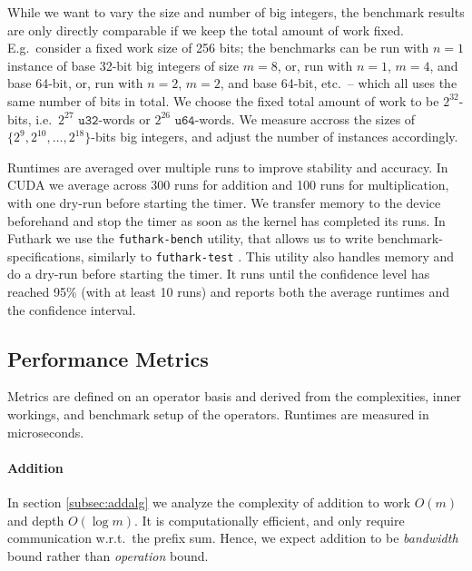 While we want to vary the size and number of big integers, the benchmark results
are only directly comparable if we keep the total amount of work fixed. E.g.\
consider a fixed work size of 256 bits; the benchmarks can be run with $n=1$
instance of base 32-bit big integers of size $m=8$, or, run with $n=1$, $m=4$,
and base 64-bit, or, run with $n=2$, $m=2$, and base 64-bit, etc.\ -- which all
uses the same number of bits in total. We choose the fixed total amount of work
to be $2^{32}$-bits, i.e.\ $2^{27}$ $\mathtt{u32}$-words or $2^{26}$
$\mathtt{u64}$-words. We measure accross the sizes of
$\{2^9,2^{10},\ldots,2^{18}\}$-bits big integers, and adjust the number of instances
accordingly.

Runtimes are averaged over multiple runs to improve stability and accuracy. In
CUDA we average across 300 runs for addition and 100 runs for multiplication,
with one dry-run before starting the timer. We transfer memory to the device
beforehand and stop the timer as soon as the kernel has completed its runs. In
Futhark we use the \texttt{futhark-bench} utility, that allows us to write
benchmark-specifications, similarly to \texttt{futhark-test}
\cite{futguide}. This utility also handles memory and do a dry-run before
starting the timer. It runs until the confidence level has reached 95\% (with at
least 10 runs) and reports both the average runtimes and the confidence
interval.

\subsection{Performance Metrics}
\label{subsec:perfmet}

Metrics are defined on an operator basis and derived from the complexities,
inner workings, and benchmark setup of the operators. Runtimes are measured in
microseconds.

\paragraph{Addition}
In section \ref{subsec:addalg} we analyze the complexity of addition to work
$O(m)$ and depth $O(\log m)$. It is computationally efficient, and only require
communication w.r.t.\ the prefix sum. Hence, we expect addition to be
\textit{bandwidth} bound rather than \textit{operation} bound.

